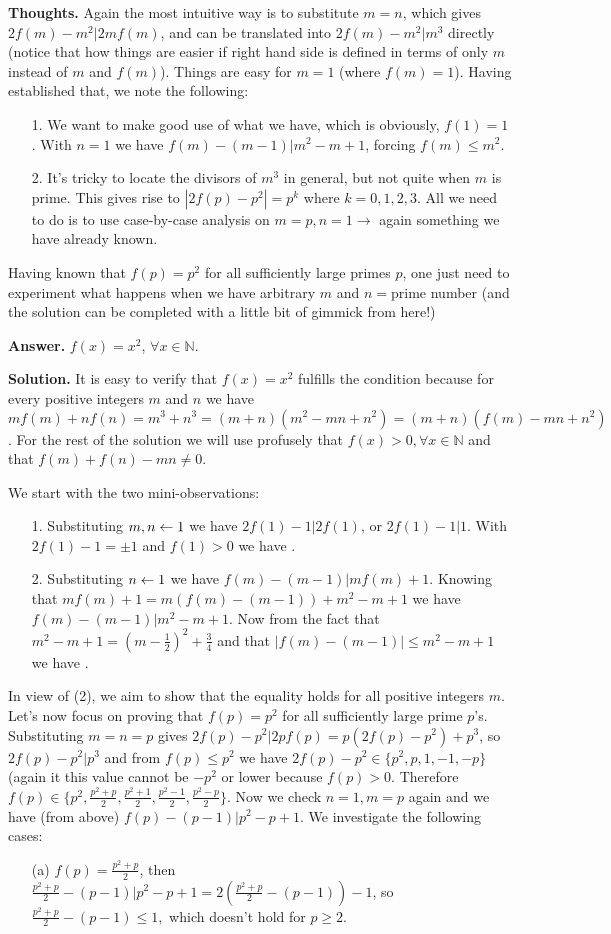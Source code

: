 \documentclass[11pt,a4paper]{article}
\begin{document}
\begin{itemize}
\textbf{Thoughts.} Again the most intuitive way is to substitute $m=n$, which gives $2f(m)-m^2|2mf(m)$, and can be translated into $2f(m)-m^2|m^3$ directly (notice that how things are easier if right hand side is defined in terms of only $m$ instead of $m$ and $f(m)$). Things are easy for $m=1$ (where $f(m)=1$). Having established that, we note the following: 
\begin{itemize}
\item [1.] We want to make good use of what we have, which is obviously, $f(1)=1$. With $n=1$ we have $f(m)-(m-1)|m^2-m+1$, forcing $f(m)\le m^2$. 
\item [2.] It's tricky to locate the divisors of $m^3$ in general, but not quite when $m$ is prime. This gives rise to $|2f(p)-p^2|=p^k$ where $k=0, 1, 2, 3$. All we need to do is to use case-by-case analysis on $m=p, n=1\to$ again something we have already known. 
\end{itemize}
Having known that $f(p)=p^2$ for all sufficiently large primes $p$, one just need to experiment what happens when we have arbitrary $m$ and $n=$prime number (and the solution can be completed with a little bit of gimmick from here!)

\textbf{Answer.} $f(x)=x^2$, $\forall x\in\mathbb{N}$. 

\textbf{Solution.}
It is easy to verify that $f(x)=x^2$ fulfills the condition because for every positive integers $m$ and $n$ we have 
$mf(m)+nf(n)=m^3+n^3=(m+n)(m^2-mn+n^2)=(m+n)(f(m)-mn+n^2)$. For the rest of the solution we will use profusely that $f(x)>0, \forall x\in\mathbb{N}$ and that $f(m)+f(n)-mn\neq 0$. 

We start with the two mini-observations: 
\begin{itemize}
\item [1.] Substituting $m, n\leftarrow 1$ we have $2f(1)-1|2f(1)$, or $2f(1)-1|1$. With $2f(1)-1=\pm 1$ and $f(1)>0$ we have . 
\item [2.] Substituting $n\leftarrow 1$ we have $f(m)-(m-1)|mf(m)+1$. Knowing that $mf(m)+1=m(f(m)-(m-1))+m^2-m+1$ we have 
$f(m)-(m-1)|m^2-m+1$. Now from the fact that $m^2-m+1=\left(m-\frac 12\right)^2+\frac 34$ and that $|f(m)-(m-1)|\le m^2-m+1$ we have . 
\end{itemize}

In view of (2), we aim to show that the equality holds for all positive integers $m$. Let's now focus on proving that $f(p)=p^2$ for all sufficiently large prime $p$'s. 
Substituting $m=n=p$ gives $2f(p)-p^2|2pf(p)=p(2f(p)-p^2)+p^3$, so 
$2f(p)-p^2|p^3$ and from $f(p)\le p^2$ we have 
$2f(p)-p^2\in\{p^2, p, 1, -1, -p\}$ (again it this value cannot be $-p^2$ or lower because $f(p)>0$. 
Therefore $f(p)\in\{p^2, \frac{p^2+p}2, \frac{p^2+1}2, \frac{p^2-1}2, \frac{p^2-p}2\}$. 
Now we check $n=1, m=p$ again and we have (from above) $f(p)-(p-1)|p^2-p+1$. 
We investigate the following cases: 
\begin{itemize}
\item [(a)] $f(p)=\frac{p^2+p}2$, 
then $\frac{p^2+p}2-(p-1)|p^2-p+1=2(\frac{p^2+p}2-(p-1))-1$, 
so $\frac{p^2+p}2-(p-1)\le 1, $
which doesn't hold for $p\ge 2$. 


\end{itemize}
\end{itemize}
\end{document}
